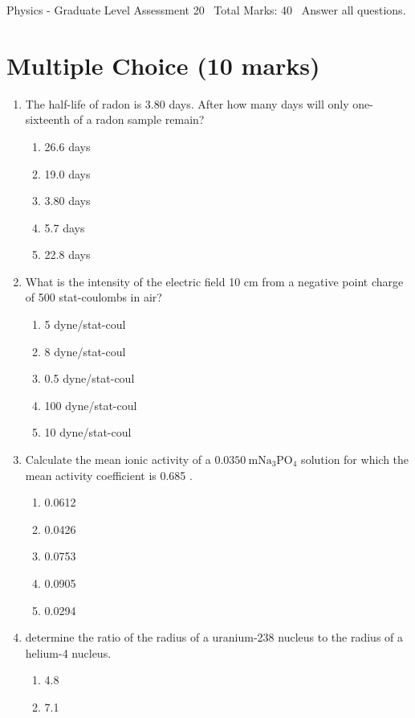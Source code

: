 \documentclass[12pt]{article}
\begin{document}
\begin{center}
Physics - Graduate Level Assessment 20 \
Total Marks: 40 \
Answer all questions.
\end{center}

\section*{Multiple Choice (10 marks)}
\begin{enumerate}[label=\arabic*.]
\item The half-life of radon is 3.80 days. After how many days will only one-sixteenth of a radon sample remain?
\begin{enumerate}[label=(\alph*)]
    \item 26.6 days
    \item 19.0 days
    \item 3.80 days
    \item 5.7 days
    \item 22.8 days
\end{enumerate}
\item What is the intensity of the electric field 10 cm from a negative point charge of 500 stat-coulombs in air?
\begin{enumerate}[label=(\alph*)]
    \item 5 dyne/stat-coul
    \item 8 dyne/stat-coul
    \item 0.5 dyne/stat-coul
    \item 100 dyne/stat-coul
    \item 10 dyne/stat-coul
\end{enumerate}
\item Calculate the mean ionic activity of a $0.0350 \mathrm{~m} \mathrm{Na}_3 \mathrm{PO}_4$ solution for which the mean activity coefficient is 0.685 .
\begin{enumerate}[label=(\alph*)]
    \item 0.0612
    \item 0.0426
    \item 0.0753
    \item 0.0905
    \item 0.0294
\end{enumerate}
\item determine the ratio of the radius of a uranium-238 nucleus to the radius of a helium-4 nucleus.
\begin{enumerate}[label=(\alph*)]
    \item 4.8
    \item 7.1

\end{enumerate}
\end{enumerate}
\end{document}
